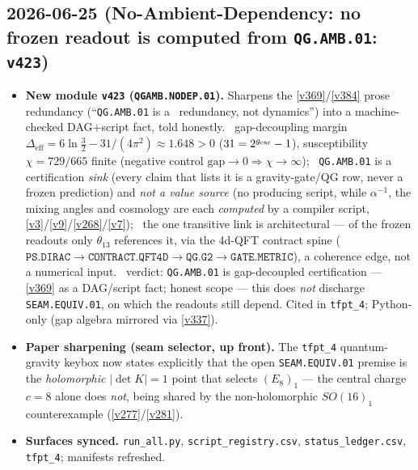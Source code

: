 \subsection*{2026-06-25 (No-Ambient-Dependency: no frozen readout is computed from \texttt{QG.AMB.01}: \texttt{v423})}
\begin{itemize}
\item \textbf{New module \texttt{v423} (\texttt{QGAMB.NODEP.01}).} Sharpens the \vref{v369}/\vref{v384}
prose redundancy (``\texttt{QG.AMB.01} is a \mC\ redundancy, not dynamics'') into a machine-checked
DAG${+}$script fact, told honestly. \mE\ gap-decoupling margin
$\Delta_{\mathrm{eff}}=6\ln\tfrac32-31/(4\pi^2)\approx1.648>0$ ($31=2^{g_{\mathrm{car}}}-1$), susceptibility
$\chi=729/665$ finite (negative control $\mathrm{gap}\!\to\!0\Rightarrow\chi\!\to\!\infty$); \mE\
\texttt{QG.AMB.01} is a certification \emph{sink} (every claim that lists it is a gravity-gate/QG row, never a
frozen prediction) and \emph{not a value source} (no producing script, while $\alpha^{-1}$, the mixing angles
and cosmology are each \emph{computed} by a compiler script, \vref{v3}/\vref{v9}/\vref{v268}/\vref{v7}); \mE\
the one transitive link is architectural --- of the frozen readouts only $\theta_{13}$ references it, via the
4d-QFT contract spine ($\texttt{PS.DIRAC}{\to}\texttt{CONTRACT.QFT4D}{\to}\texttt{QG.G2}{\to}\texttt{GATE.METRIC}$),
a coherence edge, not a numerical input. \mC\ verdict: \texttt{QG.AMB.01} is gap-decoupled certification ---
\vref{v369} as a DAG/script fact; honest scope --- this does \emph{not} discharge \texttt{SEAM.EQUIV.01}, on
which the readouts still depend. Cited in \texttt{tfpt\_4}; Python-only (gap algebra mirrored via \vref{v337}).
\item \textbf{Paper sharpening (seam selector, up front).} The \texttt{tfpt\_4} quantum-gravity keybox now
states explicitly that the open \texttt{SEAM.EQUIV.01} premise is the \emph{holomorphic} $|\det K|{=}1$ point
that selects $(E_8)_1$ --- the central charge $c{=}8$ alone does \emph{not}, being shared by the
non-holomorphic $SO(16)_1$ counterexample (\vref{v277}/\vref{v281}).
\item \textbf{Surfaces synced.} \texttt{run\_all.py}, \texttt{script\_registry.csv},
\texttt{status\_ledger.csv}, \texttt{tfpt\_4}; manifests refreshed.
\end{itemize}

